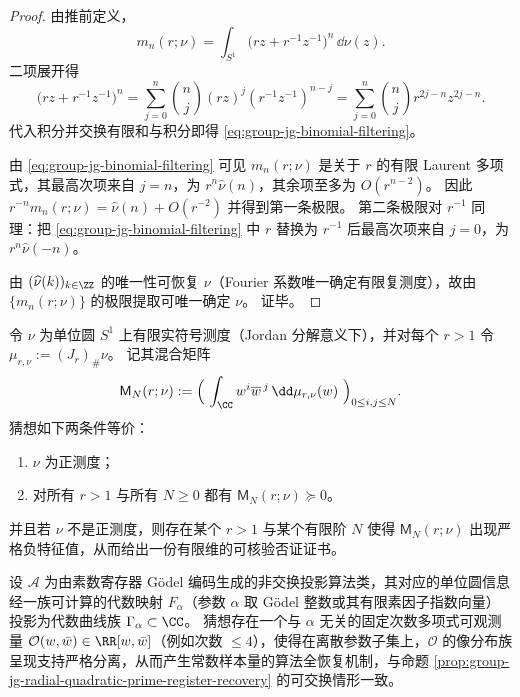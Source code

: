 \begin{proof}
由推前定义，
\[
m_n(r;\nu)=\int_{S^1}\bigl(rz+r^{-1}z^{-1}\bigr)^n\,\dd\nu(z).
\]
二项展开得
\[
\bigl(rz+r^{-1}z^{-1}\bigr)^n
=\sum_{j=0}^{n}\binom{n}{j}(rz)^j(r^{-1}z^{-1})^{n-j}
=\sum_{j=0}^{n}\binom{n}{j}r^{2j-n}z^{2j-n}.
\]
代入积分并交换有限和与积分即得 \eqref{eq:group-jg-binomial-filtering}。
\par
由 \eqref{eq:group-jg-binomial-filtering} 可见 \(m_n(r;\nu)\) 是关于 \(r\) 的有限 Laurent 多项式，其最高次项来自 \(j=n\)，为 \(r^n\widehat\nu(n)\)，其余项至多为 \(O(r^{n-2})\)。
因此
\(
r^{-n}m_n(r;\nu)=\widehat\nu(n)+O(r^{-2})
\)
并得到第一条极限。
第二条极限对 \(r^{-1}\) 同理：把 \eqref{eq:group-jg-binomial-filtering} 中 \(r\) 替换为 \(r^{-1}\) 后最高次项来自 \(j=0\)，为 \(r^n\widehat\nu(-n)\)。
\par
由 \((\widehat\nu(k))_{k\in\ZZ}\) 的唯一性可恢复 \(\nu\)（Fourier 系数唯一确定有限复测度），故由 \(\{m_n(r;\nu)\}\) 的极限提取可唯一确定 \(\nu\)。
证毕。
\end{proof}

\begin{conjecture}\label{conj:group-jg-elliptic-hankel-separation}
令 \(\nu\) 为单位圆 \(S^1\) 上有限实符号测度（Jordan 分解意义下），并对每个 \(r>1\) 令 \(\mu_{r,\nu}:=(J_r)_\#\nu\)。
记其混合矩阵
\[
\mathsf M_N(r;\nu):=\Bigl(\ \int_{\CC} w^i\overline{w}^{\,j}\,\dd\mu_{r,\nu}(w)\ \Bigr)_{0\le i,j\le N}.
\]
猜想如下两条件等价：
\begin{enumerate}
  \item \(\nu\) 为正测度；
  \item 对所有 \(r>1\) 与所有 \(N\ge 0\) 都有 \(\mathsf M_N(r;\nu)\succeq 0\)。
\end{enumerate}
并且若 \(\nu\) 不是正测度，则存在某个 \(r>1\) 与某个有限阶 \(N\) 使得 \(\mathsf M_N(r;\nu)\) 出现严格负特征值，从而给出一份有限维的可核验否证证书。
\end{conjecture}

\begin{conjecture}[非交换投影的低阶可观测解码泛化]\label{conj:group-jg-noncommutative-low-order-observable-decoding}
设 \(\mathcal A\) 为由素数寄存器 Gödel 编码生成的非交换投影算法类，其对应的单位圆信息经一族可计算的代数映射 \(F_{\alpha}\)（参数 \(\alpha\) 取 Gödel 整数或其有限素因子指数向量）投影为代数曲线族 \(\Gamma_\alpha\subset\CC\)。
猜想存在一个与 \(\alpha\) 无关的固定次数多项式可观测量 \(\mathcal O(w,\bar w)\in\RR[w,\bar w]\)（例如次数 \(\le 4\)），使得在离散参数子集上，\(\mathcal O\) 的像分布族呈现支持严格分离，从而产生常数样本量的算法全恢复机制，与命题 \ref{prop:group-jg-radial-quadratic-prime-register-recovery} 的可交换情形一致。
\end{conjecture}

